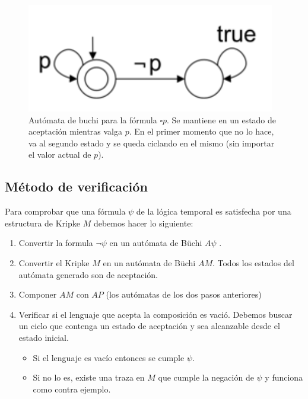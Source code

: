 \begin{figure}[h]
\centering
	\includegraphics[scale=0.5]{imagenes/buchi-siempre-p}
	\caption{Autómata de buchi para la fórmula $\square p$. Se mantiene en un estado de aceptación mientras valga $p$. En el primer momento que no lo hace, va al segundo estado y se queda ciclando en el mismo (sin importar el valor actual de $p$).}
\end{figure}

\subsection{Método de verificación}
Para comprobar que una fórmula $\psi$ de la lógica temporal es satisfecha por una estructura de Kripke $M$ debemos hacer lo siguiente:
\begin{enumerate}
    \item Convertir la formula $\lnot \psi$  en un autómata de Büchi $A\psi$ .
    \item Convertir el Kripke $M$ en un autómata de Büchi $AM$. Todos los estados del autómata generado son de aceptación.
    \item Componer $AM$ con $AP$ (los autómatas de los dos pasos anteriores)
    \item Verificar si el lenguaje que acepta la composición es vació. Debemos buscar un ciclo que contenga un estado de aceptación y sea alcanzable desde el estado inicial.
    \begin{itemize}
    	\item Si el lenguaje es vacío entonces se cumple $\psi$.
    	\item Si no lo es, existe una traza en $M$ que cumple la negación de $\psi$ y funciona como contra ejemplo.
    \end{itemize}
\end{enumerate}
